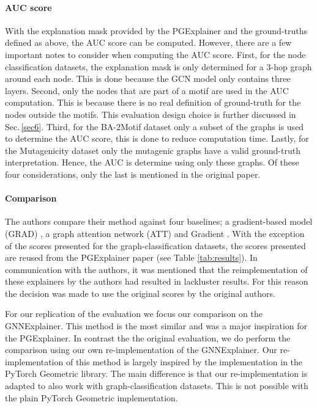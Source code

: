 \paragraph{AUC score}
With the explanation mask provided by the PGExplainer and the ground-truths defined as above, the AUC score can be computed. However, there are a few important notes to consider when computing the AUC score. First, for the node classification datasets, the explanation mask is only determined for a 3-hop graph around each node. This is done because the GCN model only contains three layers. Second, only the nodes that are part of a motif are used in the AUC computation. This is because there is no real definition of ground-truth for the nodes outside the motifs. This evaluation design choice is further discussed in Sec.\,\ref{sec6}. Third, for the BA-2Motif dataset only a subset of the graphs is used to determine the AUC score, this is done to reduce computation time. Lastly, for the Mutagenicity dataset only the mutagenic graphs have a valid ground-truth interpretation. Hence, the AUC is determine using only these graphs. Of these four considerations, only the last is mentioned in the original paper. 

\paragraph{Comparison} The authors compare their method against four baselines; a gradient-based model (GRAD) \cite{ying2019gnnexplainer}, a graph attention network (ATT) \cite{velivckovic2017graph} and Gradient \cite{pope2019explainability}. With the exception of the scores presented for the graph-classification datasets, the scores presented are reused from the PGExplainer paper (see Table \ref{tab:results}). In communication with the authors, it was mentioned that the reimplementation of these explainers by the authors had resulted in lackluster results. For this reason the decision was made to use the original scores by the original authors. 

For our replication of the evaluation we focus our comparison on the GNNExplainer. This method is the most similar and was a major inspiration for the PGExplainer. In contrast the the original evaluation, we do perform the comparison using our own re-implementation of the GNNExplainer. Our re-implementation of this method is largely inspired by the implementation in the PyTorch Geometric library. The main difference is that our re-implementation is adapted to also work with graph-classification datasets. This is not possible with the plain PyTorch Geometric implementation. 


